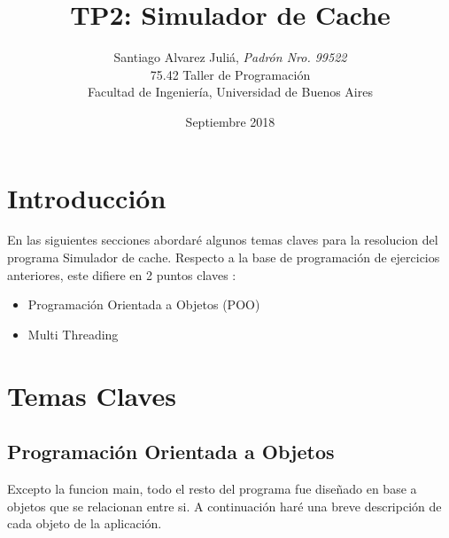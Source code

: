 \documentclass[a4paper,12pt]{report}
\title{TP2: Simulador de Cache}
\author{	Santiago Alvarez Juli\'a, \textit{Padr\'on Nro. 99522}                     \\
            \normalsize{75.42 Taller de Programaci\'on}                             \\
            \normalsize{Facultad de Ingenier\'ia, Universidad de Buenos Aires}            \\
       }
\date{Septiembre 2018}
\begin{document}
\maketitle

\thispagestyle{empty}

\tableofcontents
\newpage
{}

\section{Introducci\'on}

En las siguientes secciones abordar\'e algunos temas claves para la resolucion del programa Simulador de cache. Respecto a la base de programaci\'on de ejercicios anteriores, este difiere en 2 puntos claves :

\begin{itemize}
\item Programaci\'on Orientada a Objetos (POO)
\item Multi Threading
\end{itemize}


\section{Temas Claves}

\subsection{Programaci\'on Orientada a Objetos}

Excepto la funcion main, todo el resto del programa fue dise\~nado en base a objetos que se relacionan entre si. A continuaci\'on har\'e una breve descripci\'on de cada objeto de la aplicaci\'on.
\end{document}

